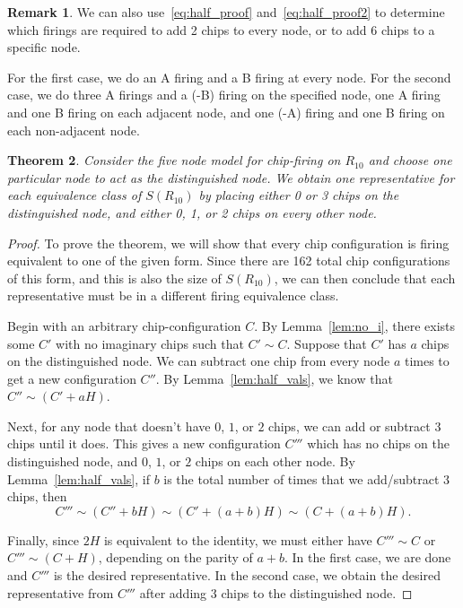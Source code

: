 \documentclass[12p]{amsart}
\numberwithin{equation}{section}
\theoremstyle{plain}
\newtheorem{thm}{Theorem}[section]
\theoremstyle{definition}
\newtheorem{remark}[thm]{Remark}
\begin{document}
\begin{remark}\label{rem:specific}
    We can also use~\eqref{eq:half_proof} and~\eqref{eq:half_proof2} to determine which firings are required to add 2 chips to every node, or to add 6 chips to a specific node. 

    For the first case, we do an A firing and a B firing at every node. For the second case, we do three A  firings and a (-B) firing on the specified node, one A firing and one B firing on each adjacent node, and one (-A) firing and one B firing on each non-adjacent node. 
\end{remark}

\begin{thm}\label{thm:representatives}
    Consider the five node model for chip-firing on $R_{10}$ and choose one particular node to act as \emph{the distinguished node}. We obtain one representative for each equivalence class of $S(R_{10})$ by placing either 0 or 3 chips on the distinguished node, and either 0, 1, or 2 chips on every other node. 
\end{thm}
\begin{proof}
    To prove the theorem, we will show that every chip configuration is firing equivalent to one of the given form. Since there are 162 total chip configurations of this form, and this is also the size of $S(R_{10})$, we can then conclude that each representative must be in a different firing equivalence class.
    
    Begin with an arbitrary chip-configuration $C$. By Lemma~\ref{lem:no_i}, there exists some $C'$ with no imaginary chips such that $C' \sim C$. Suppose that $C'$ has $a$ chips on the distinguished node. We can subtract one chip from every node $a$ times to get a new configuration $C''$. By Lemma~\ref{lem:half_vals}, we know that $C'' \sim (C' + aH)$. 

    Next, for any node that doesn't have $0$, $1$, or $2$ chips, we can add or subtract 3 chips until it does. This gives a new configuration $C'''$ which has no chips on the distinguished node, and $0$, $1$, or $2$ chips on each other node. By Lemma~\ref{lem:half_vals}, if $b$ is the total number of times that we add/subtract $3$ chips, then \[C''' \sim (C'' + bH) \sim (C' + (a+b)H) \sim (C + (a+b)H).\]

    Finally, since $2H$ is equivalent to the identity, we must either have $C''' \sim C$ or $C''' \sim (C + H)$, depending on the parity of $a+b$. In the first case, we are done and $C'''$ is the desired representative. In the second case, we obtain the desired representative from $C'''$ after adding $3$ chips to the distinguished node. 
\end{proof}
\end{document}
